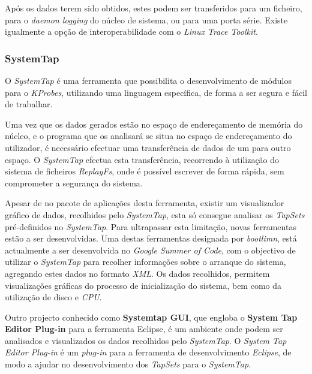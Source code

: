 Após os dados terem sido obtidos, estes podem ser transferidos para um ficheiro, para o \textit{daemon logging} do núcleo de sistema, ou para uma porta série.
Existe igualmente a opção de interoperabilidade com o \textit{Linux Trace Toolkit}\cite{:DProbes}.

\subsubsection{SystemTap}\label{cap:Systemtap_overview}
O \textit{SystemTap} é uma ferramenta que possibilita o desenvolvimento de módulos para o \textit{KProbes}, utilizando uma linguagem específica, de forma a ser segura e fácil de trabalhar.



Uma vez que os dados gerados estão no espaço de endereçamento de memória do núcleo, e o programa que os analisará se situa no espaço de endereçamento do utilizador, é necessário efectuar uma transferência de dados de um para outro espaço.
O \textit{SystemTap} efectua esta transferência, recorrendo à utilização do sistema de ficheiros \textit{ReplayFs}, onde é possível escrever de forma rápida, sem comprometer a segurança do sistema\cite{Donovan2007,Jones2009}.

Apesar de no pacote de aplicações desta ferramenta, existir um visualizador gráfico de dados, recolhidos pelo \textit{SystemTap}, esta só consegue analisar os \textit{TapSets} pré-definidos no \textit{SystemTap}.
Para ultrapassar esta limitação, novas ferramentas estão a ser desenvolvidas.
Uma destas ferramentas designada por \textit{bootlimn}, está actualmente a ser desenvolvida no \textit{Google Summer of Code}, com o objectivo de utilizar o \textit{SystemTap} para recolher informações sobre o arranque do sistema, agregando estes dados no formato \textit{XML}.
Os dados recolhidos, permitem visualizações gráficas do processo de inicialização do sistema, bem como da utilização de disco e \textit{CPU}.

Outro projecto conhecido como \textbf{Systemtap GUI}, que engloba o \textbf{System Tap Editor Plug-in} para a ferramenta Eclipse, é um ambiente onde podem ser analisados e visualizados os dados recolhidos pelo \textit{SystemTap}.
O \textit{System Tap Editor Plug-in} é um \textit{plug-in} para a ferramenta de desenvolvimento \textit{Eclipse}, de modo a ajudar no desenvolvimento dos \textit{TapSets} para o \textit{SystemTap}.

